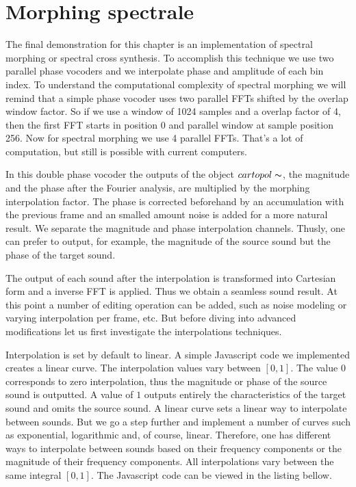 \section{Morphing spectrale}

The final demonstration for this chapter is an implementation of spectral morphing or spectral cross synthesis. To accomplish this technique we use two parallel phase vocoders and we interpolate phase and amplitude of each bin index. To understand the computational complexity of spectral morphing we will remind that a simple phase vocoder uses two parallel FFTs shifted by the overlap window factor. So if we use a window of 1024 samples and a overlap factor of 4, then the first FFT starts in position $0$ and parallel window at sample position 256. Now for spectral morphing we use 4 parallel FFTs. That's a lot of computation, but still is possible with current computers.

In this double phase vocoder the outputs of the object $cartopol\thicksim$, the magnitude and the phase after the Fourier analysis, are multiplied by the morphing interpolation factor. The phase is corrected beforehand by an accumulation with the previous frame and an smalled amount noise is added for a more natural result. We separate the magnitude and phase interpolation channels. Thusly, one can prefer to output, for example, the magnitude of the source sound but the phase of the target sound. 

The output of each sound after the interpolation is transformed into Cartesian form and a inverse FFT is applied. Thus we obtain a seamless sound result. At this point a number of editing operation can be added, such as noise modeling or varying interpolation per frame, etc. But before diving into advanced modifications let us first investigate the interpolations techniques.

Interpolation is set by default to linear. A simple Javascript code we implemented creates a linear curve. The interpolation values vary between $[0, 1]$. The value $0$ corresponds to zero interpolation, thus the magnitude or phase of the source sound is outputted. A value of $1$ outputs entirely the characteristics of the target sound and omits the source sound. A linear curve sets a linear way to interpolate between sounds. But we go a step further and implement a number of curves such as exponential, logarithmic and, of course, linear. Therefore, one has different ways to interpolate between sounds based on their frequency components or the magnitude of their frequency components. All interpolations vary between the same integral $[0, 1]$. The Javascript code can be viewed in the listing bellow.

